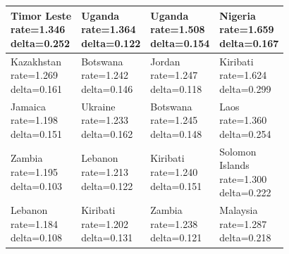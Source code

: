 \documentclass[runningheads]{llncs}
\begin{document}
{\begin{longtable}{p{}p{}p{}p{}}
\hline
\shortstack[l]{Timor Leste\\ rate=1.346\\ delta=0.252} &\shortstack[l]{Uganda\\ rate=1.364\\ delta=0.122} &\shortstack[l]{Uganda\\ rate=1.508\\ delta=0.154} &\shortstack[l]{Nigeria\\ rate=1.659\\ delta=0.167} \\
\hline
\shortstack[l]{Kazakhstan\\ rate=1.269\\ delta=0.161} &\shortstack[l]{Botswana\\ rate=1.242\\ delta=0.146} &\shortstack[l]{Jordan\\ rate=1.247\\ delta=0.118} &\shortstack[l]{Kiribati\\ rate=1.624\\ delta=0.299} \\
\hline
\shortstack[l]{Jamaica\\ rate=1.198\\ delta=0.151} &\shortstack[l]{Ukraine\\ rate=1.233\\ delta=0.162} &\shortstack[l]{Botswana\\ rate=1.245\\ delta=0.148} &\shortstack[l]{Laos\\ rate=1.360\\ delta=0.254} \\
\hline
\shortstack[l]{Zambia\\ rate=1.195\\ delta=0.103} &\shortstack[l]{Lebanon\\ rate=1.213\\ delta=0.122} &\shortstack[l]{Kiribati\\ rate=1.240\\ delta=0.151} &\shortstack[l]{Solomon\\ Islands\\ rate=1.300\\ delta=0.222} \\
\hline
\shortstack[l]{Lebanon\\ rate=1.184\\ delta=0.108} &\shortstack[l]{Kiribati\\ rate=1.202\\ delta=0.131} &\shortstack[l]{Zambia\\ rate=1.238\\ delta=0.121} &\shortstack[l]{Malaysia\\ rate=1.287\\ delta=0.218} \\

\end{longtable}}
\end{document}
